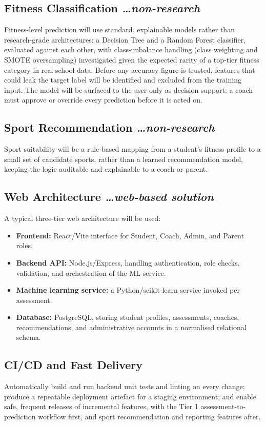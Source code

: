 \documentclass[11pt,a4paper]{article}
\newcommand{\BvrHint}[1]{%
  {\normalfont\normalsize\itshape\hfill #1}}
\begin{document}
\subsection{Fitness Classification %
\BvrHint{\ldots non-research}}
Fitness-level prediction will use standard, explainable
models rather than research-grade architectures: a
Decision Tree and a Random Forest classifier, evaluated
against each other, with class-imbalance handling (class
weighting and SMOTE oversampling) investigated given the
expected rarity of a top-tier fitness category in real
school data. Before any accuracy figure is trusted,
features that could leak the target label will be
identified and excluded from the training input. The model
will be surfaced to the user only as decision support: a
coach must approve or override every prediction before it
is acted on.

\subsection{Sport Recommendation %
\BvrHint{\ldots non-research}}
Sport suitability will be a rule-based mapping from a
student's fitness profile to a small set of candidate
sports, rather than a learned recommendation model, keeping
the logic auditable and explainable to a coach or parent.

\subsection{Web Architecture %
\BvrHint{\ldots web-based solution}}
A typical three-tier web architecture will be used:
\begin{itemize}[leftmargin=0.7cm]
    \item \textbf{Frontend:} React/Vite interface for Student, Coach, Admin, and Parent roles.
    \item \textbf{Backend API:} Node.js/Express, handling authentication, role checks, validation, and orchestration of the ML service.
    \item \textbf{Machine learning service:} a Python/scikit-learn service invoked per assessment.
    \item \textbf{Database:} PostgreSQL, storing student profiles, assessments, coaches, recommendations, and administrative accounts in a normalised relational schema.
\end{itemize}

\subsection{CI/CD and Fast Delivery}
Automatically build and run backend unit tests and linting
on every change; produce a repeatable deployment artefact
for a staging environment; and enable safe, frequent
releases of incremental features, with the Tier 1
assessment-to-prediction workflow first, and sport
recommendation and reporting features after.
\end{document}
